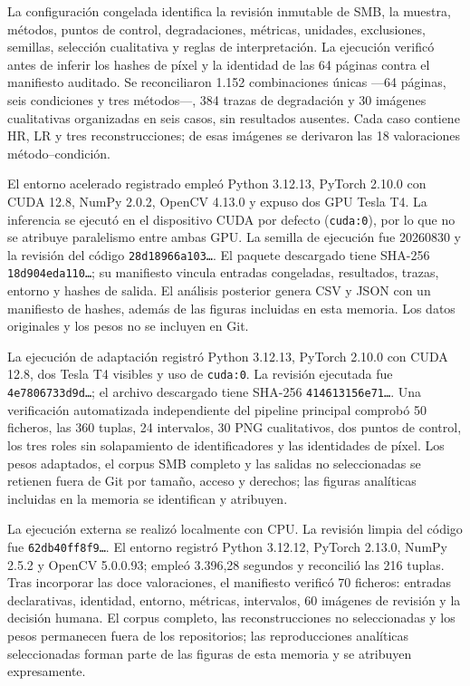 La configuración congelada identifica la revisión inmutable de SMB, la muestra, métodos, puntos de
control, degradaciones, métricas, unidades, exclusiones, semillas, selección cualitativa
y reglas de interpretación. La ejecución verificó antes de inferir los hashes de píxel y la
identidad de las 64 páginas contra el manifiesto auditado. Se reconciliaron 1.152 combinaciones únicas
---64 páginas, seis condiciones y tres métodos---, 384 trazas de degradación y 30 imágenes
cualitativas organizadas en seis casos, sin resultados ausentes. Cada caso contiene HR, LR y tres
reconstrucciones; de esas imágenes se derivaron las 18 valoraciones método--condición.

El entorno acelerado registrado empleó Python 3.12.13, PyTorch 2.10.0 con CUDA 12.8, NumPy 2.0.2,
OpenCV 4.13.0 y expuso dos GPU Tesla T4. La inferencia se ejecutó en el dispositivo CUDA por defecto
(\texttt{cuda:0}), por lo que no se atribuye paralelismo entre ambas GPU. La semilla de ejecución fue 20260830 y la revisión del código
\texttt{28d18966a103\ldots}. El paquete descargado tiene SHA-256
\texttt{18d904eda110\ldots}; su manifiesto vincula entradas congeladas, resultados, trazas,
entorno y hashes de salida. El análisis posterior genera CSV y JSON con un manifiesto de hashes,
además de las figuras incluidas en esta memoria. Los datos originales y los pesos no se incluyen en
Git.

La ejecución de adaptación registró Python 3.12.13, PyTorch 2.10.0 con CUDA 12.8, dos Tesla T4
visibles y uso de \texttt{cuda:0}. La revisión ejecutada fue
\texttt{4e7806733d9d\ldots}; el archivo descargado tiene SHA-256
\texttt{414613156e71\ldots}. Una verificación automatizada independiente del pipeline principal
comprobó 50 ficheros, las 360 tuplas, 24 intervalos, 30 PNG cualitativos, dos puntos de control, los
tres roles sin solapamiento de identificadores y las identidades de píxel. Los pesos adaptados,
el corpus SMB completo y las salidas no seleccionadas se retienen fuera de Git por tamaño,
acceso y derechos; las figuras analíticas incluidas en la memoria se identifican y atribuyen.

La ejecución externa se realizó localmente con CPU. La revisión limpia del código fue
\texttt{62db40ff8f9\ldots}. El entorno registró Python 3.12.12, PyTorch 2.13.0, NumPy 2.5.2 y
OpenCV 5.0.0.93;
empleó 3.396,28 segundos y reconcilió las 216 tuplas. Tras incorporar las doce valoraciones, el
manifiesto verificó 70 ficheros: entradas declarativas, identidad, entorno, métricas, intervalos,
60 imágenes de revisión y la decisión humana. El corpus completo, las reconstrucciones no
seleccionadas y los pesos permanecen fuera de los repositorios; las reproducciones analíticas
seleccionadas forman parte de las figuras de esta memoria y se atribuyen expresamente.
